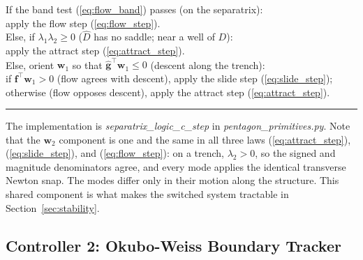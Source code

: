 \documentclass[lettersize,journal]{IEEEtran}
\begin{document}
\vspace{3pt}
\noindent If the band test (\ref{eq:flow_band}) passes (on the
separatrix):\\
\hspace*{1.5em} apply the flow step (\ref{eq:flow_step}).\\
Else, if $\lambda_1 \lambda_2 \geq 0$ ($\hat{D}$ has no saddle; near a
well of $D$):\\
\hspace*{1.5em} apply the attract step (\ref{eq:attract_step}).\\
Else, orient $\mathbf{w}_1$ so that $\hat{\mathbf{g}}^\top \mathbf{w}_1
\leq 0$ (descent along the trench):\\
\hspace*{1.5em} if $\mathbf{f}^\top \mathbf{w}_1 > 0$ (flow agrees with
descent), apply the slide step (\ref{eq:slide_step});\\
\hspace*{1.5em} otherwise (flow opposes descent), apply the attract
step (\ref{eq:attract_step}).
\vspace{4pt}
\hrule
\vspace{4pt}

The implementation is \textit{separatrix\_logic\_c\_step} in
\textit{pentagon\_primitives.py}. Note that the $\mathbf{w}_2$
component is one and the same in all three laws
(\ref{eq:attract_step}), (\ref{eq:slide_step}), and
(\ref{eq:flow_step}): on a trench, $\lambda_2 > 0$, so the signed and
magnitude denominators agree, and every mode applies the identical
transverse Newton snap. The modes differ only in their motion along the
structure. This shared component is what makes the switched system
tractable in Section~\ref{sec:stability}.

\subsection{Controller 2: Okubo-Weiss Boundary Tracker}
\label{sec:ow_controller}
\end{document}
